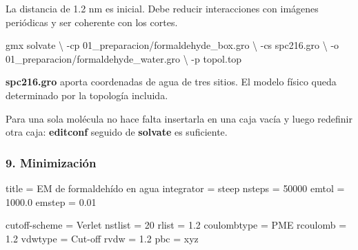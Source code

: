 \documentclass[
  spanish,
  11pt,
  a4paper]{article}
\newenvironment{Shaded}{\begin{snugshade}}{\end{snugshade}}
\newcommand{\AttributeTok}[1]{\textcolor[rgb]{0.13,0.29,0.53}{#1}}
\newcommand{\DataTypeTok}[1]{\textcolor[rgb]{0.13,0.29,0.53}{#1}}
\newcommand{\DecValTok}[1]{\textcolor[rgb]{0.00,0.00,0.81}{#1}}
\newcommand{\ExtensionTok}[1]{#1}
\newcommand{\FloatTok}[1]{\textcolor[rgb]{0.00,0.00,0.81}{#1}}
\newcommand{\NormalTok}[1]{#1}
\newcommand{\OtherTok}[1]{\textcolor[rgb]{0.56,0.35,0.01}{#1}}
\newcommand{\StringTok}[1]{\textcolor[rgb]{0.31,0.60,0.02}{#1}}
\begin{document}
La distancia de 1.2 nm es inicial. Debe reducir interacciones con
imágenes periódicas y ser coherente con los cortes.

\begin{Shaded}
\begin{Highlighting}[]
\ExtensionTok{gmx}\NormalTok{ solvate }\DataTypeTok{\textbackslash{}}
    \AttributeTok{{-}cp}\NormalTok{ 01\_preparacion/formaldehyde\_box.gro }\DataTypeTok{\textbackslash{}}
    \AttributeTok{{-}cs}\NormalTok{ spc216.gro }\DataTypeTok{\textbackslash{}}
    \AttributeTok{{-}o}\NormalTok{ 01\_preparacion/formaldehyde\_water.gro }\DataTypeTok{\textbackslash{}}
    \AttributeTok{{-}p}\NormalTok{ topol.top}
\end{Highlighting}
\end{Shaded}

\textbf{spc216.gro} aporta coordenadas de agua de tres sitios. El modelo
físico queda determinado por la topología incluida.

Para una sola molécula no hace falta insertarla en una caja vacía y
luego redefinir otra caja: \textbf{editconf} seguido de \textbf{solvate}
es suficiente.

\subsubsection{9. Minimización}\label{minimizaciuxf3n}

\begin{Shaded}
\begin{Highlighting}[]
\DataTypeTok{title           }\OtherTok{=}\StringTok{ EM de formaldehído en agua}
\DataTypeTok{integrator      }\OtherTok{=}\StringTok{ steep}
\DataTypeTok{nsteps          }\OtherTok{=}\StringTok{ }\DecValTok{50000}
\DataTypeTok{emtol           }\OtherTok{=}\StringTok{ }\FloatTok{1000.0}
\DataTypeTok{emstep          }\OtherTok{=}\StringTok{ }\FloatTok{0.01}

\DataTypeTok{cutoff{-}scheme   }\OtherTok{=}\StringTok{ Verlet}
\DataTypeTok{nstlist         }\OtherTok{=}\StringTok{ }\DecValTok{20}
\DataTypeTok{rlist           }\OtherTok{=}\StringTok{ }\FloatTok{1.2}
\DataTypeTok{coulombtype     }\OtherTok{=}\StringTok{ PME}
\DataTypeTok{rcoulomb        }\OtherTok{=}\StringTok{ }\FloatTok{1.2}
\DataTypeTok{vdwtype         }\OtherTok{=}\StringTok{ Cut{-}off}
\DataTypeTok{rvdw            }\OtherTok{=}\StringTok{ }\FloatTok{1.2}
\DataTypeTok{pbc             }\OtherTok{=}\StringTok{ xyz}
\end{Highlighting}
\end{Shaded}
\end{document}
